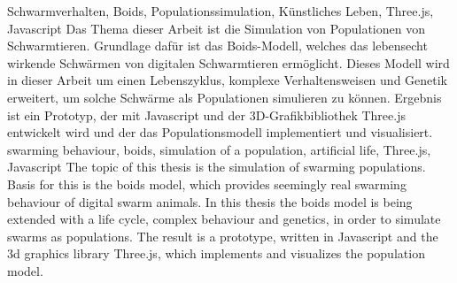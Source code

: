 \documentclass[draft=false
              ,paper=a4
              ,twoside=false
              ,fontsize=11pt
              ,headsepline
              ,BCOR10mm
              ,DIV11
              ,bibtotoc
              ,liststotoc
              ]{scrbook}
\begin{document}


\frontmatter

\maketitle

\onehalfspacing

\HAWAbstractPage
{Schwarmverhalten, Boids, Populationssimulation, Künstliches Leben, Three.js, Javascript}%
{Das Thema dieser Arbeit ist die Simulation von Populationen von Schwarmtieren. Grundlage dafür ist das Boids-Modell, welches das lebensecht wirkende Schwärmen von digitalen Schwarmtieren ermöglicht. Dieses Modell wird in dieser Arbeit um einen Lebenszyklus, komplexe Verhaltensweisen und Genetik erweitert, um solche Schwärme als Populationen simulieren zu können. Ergebnis ist ein Prototyp, der mit Javascript und der 3D-Grafikbibliothek Three.js entwickelt wird und der das Populationsmodell implementiert und visualisiert.}
{swarming behaviour, boids, simulation of a population, artificial life, Three.js, Javascript}%
{The topic of this thesis is the simulation of swarming populations. Basis for this is the boids model, which provides seemingly real swarming behaviour of digital swarm animals. In this thesis the boids model is being extended with a life cycle, complex behaviour and genetics, in order to simulate swarms as populations. The result is a prototype, written in Javascript and the 3d graphics library Three.js, which implements and visualizes the population model.}

\newpage
\singlespacing

\tableofcontents
\newpage
\listoftables
\listoffigures

\mainmatter
\onehalfspacing
\end{document}
